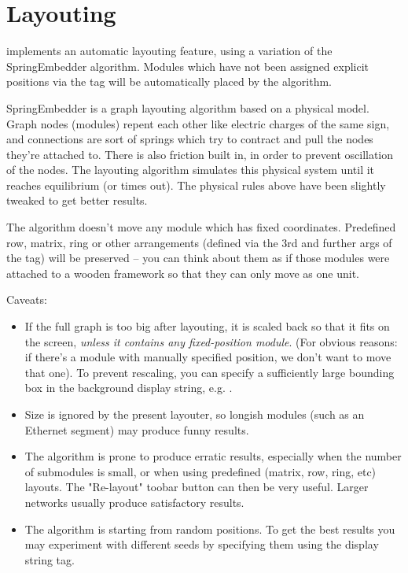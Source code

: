 \section{Layouting}
\label{sec:ch-graphics:layouting}

{\opp} implements an automatic layouting feature, using
a variation of the SpringEmbedder algorithm. Modules which have
not been assigned explicit positions via the  tag will be
automatically placed by the algorithm.

SpringEmbedder is a graph layouting algorithm based on a physical model.
Graph nodes (modules) repent each other like electric charges
of the same sign, and connections are sort of springs which try
to contract and pull the nodes they're attached to. There is also friction
built in, in order to prevent oscillation of the nodes. The layouting algorithm
simulates this physical system until it reaches equilibrium
(or times out). The physical rules above have been slightly tweaked
to get better results.

The algorithm doesn't move any module which has fixed coordinates.
Predefined row, matrix, ring or other arrangements (defined
via the 3rd and further args of the  tag) will be preserved --
you can think about them as if those modules were attached
to a wooden framework so that they can only move as one unit.

Caveats:

\begin{itemize}
  \item If the full graph is too big after layouting, it is scaled
    back so that it fits on the screen, \textit{unless it contains
    any fixed-position module}. (For obvious reasons: if there's a module
    with manually specified position, we don't want to move that one).
    To prevent rescaling, you can specify a sufficiently large bounding
    box in the background display string, e.g. .
  \item Size is ignored by the present layouter, so longish modules
    (such as an Ethernet segment) may produce funny results.
  \item The algorithm is prone to produce erratic results, especially
    when the number of submodules is small, or when using predefined
    (matrix, row, ring, etc) layouts. The "Re-layout" toobar button
    can then be very useful. Larger networks usually produce
    satisfactory results.
  \item The algorithm is starting from random positions.
     To get the best results you may experiment with
    different seeds by specifying them using the 
    display string tag.
\end{itemize}

